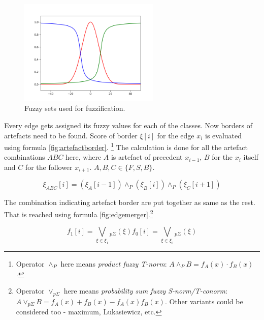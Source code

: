 \begin{figure}[h!]
\begin{center}
\includegraphics[width=0.6\textwidth]{obrazky-figures/fuzzysets.png}
\caption{Fuzzy sets used for fuzzification.\label{fig:fuzzysets}}
\end{center}
\end{figure}

Every edge gets assigned its fuzzy values for each of the classes. Now borders of artefacts need to be found.
Score of border $\xi[i]$ for the edge $x_i$ is evaluated using formula \ref{fig:artefactborder}.
\footnote{Operator $\land_P$ here means {\it product fuzzy T-norm}: $A \land_P B = f_A(x)\cdot f_B(x)$.}
The calculation is done for all the artefact combinations $ABC$ here, where $A$ is artefact of precedent $x_{i-1}$, $B$ for the
$x_i$ itself and $C$ for the follower $x_{i+1}$. $A,B,C \in \{F,S,B\}$.

\begin{equation}
\xi_{ABC}[i] = (\xi_{A}[i-1]) \land_P (\xi_{B}[i]) \land_P (\xi_{C}[i+1])
\label{fig:artefactborder}
\end{equation}

The combination indicating artefact border are put together as same as the rest. That is reached
using formula \ref{fig:edgemerger}.\footnote{Operator $\lor_{p\Sigma}$ here means
{\it probability sum fuzzy S-norm/T-conorm}: $A \lor_{p\Sigma} B = f_A(x) + f_B(x) - f_A(x)f_B(x)$.
Other variants could be considered too - maximum, Lukasiewicz, etc. }

\begin{subequations}
\begin{equation}
f_{1}[i] = \bigvee\limits_{\xi \in \xi_1}{}_{p\Sigma} (\xi)
\end{equation}
\begin{equation}
f_{0}[i] = \bigvee\limits_{\xi \in \xi_0}{}_{p\Sigma} (\xi)
\end{equation}
\label{fig:edgemerger}
\end{subequations}


